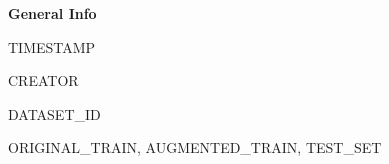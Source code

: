 \documentclass[12pt, a4paper]{article}
\begin{document}
\begin{mdframed}[
linewidth=1pt,
skipabove=0.5em,
skipbelow=0.5em,
innerleftmargin=1em,
innerrightmargin=1em,
innertopmargin=1em,
innerbottommargin=1em
]
\noindent\textbf{General Info}

\begin{description}[leftmargin=2em, labelsep=0.5em, noitemsep]
\item[timestamp:] TIMESTAMP
\item[creator:] CREATOR
\item[original dataset:] DATASET\_ID
\item[output datasets:] ORIGINAL\_TRAIN, AUGMENTED\_TRAIN, TEST\_SET
\end{description}

\end{mdframed}

\end{document}
